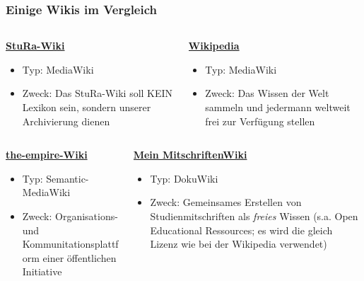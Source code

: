 \documentclass{beamer}
\begin{document}
\begin{frame}
  \frametitle{Einige Wikis im Vergleich}

  \onslide<+->
  
  \begin{columns}[t]
    
    \begin{column}{0.5\linewidth}
      \textbf{\href{http://wiki.stura.htw-dresden.de}{StuRa-Wiki}}
      \begin{itemize}
        \item Typ: MediaWiki
        \item Zweck: Das StuRa-Wiki soll KEIN Lexikon sein, sondern unserer
          Archivierung dienen
      \end{itemize}
    \end{column}

    \begin{column}{0.5\linewidth}
      \textbf{\href{http://www.wikipedia.de}{Wikipedia}}
      \begin{itemize}
        \item Typ: MediaWiki
        \item Zweck: Das Wissen der Welt sammeln und jedermann weltweit frei zur
          Verfügung stellen
      \end{itemize}
    \end{column}
  \end{columns}

  \bigskip

  \begin{columns}[t]
    \begin{column}{0.5\linewidth}
      \textbf{\href{http://www.the-empire.de}{the-empire-Wiki}}
      \begin{itemize}
        \item Typ: Semantic-MediaWiki
        \item Zweck: Organisations- und Kommunitationsplattform einer
          öffentlichen Initiative \\
      \end{itemize}
    \end{column}

    \begin{column}{0.5\linewidth}
      \textbf{\href{http://www2.htw-dresden.de/~s70341/cgi-bin/dokuwiki/doku.php}
        {Mein MitschriftenWiki}}
      \begin{itemize}
        \item Typ: DokuWiki
        \item Zweck: Gemeinsames Erstellen von Studienmitschriften als
          \emph{freies} Wissen (s.a.  Open Educational Ressources; es wird die
          gleich Lizenz wie bei der Wikipedia verwendet)
      \end{itemize}

    \end{column}
  \end{columns}
\end{frame}
\end{document}
